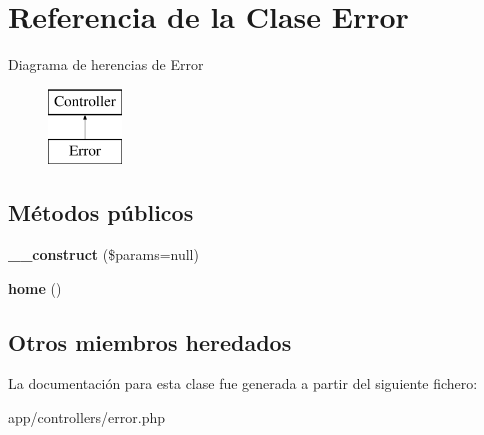 \hypertarget{class_error}{}\section{Referencia de la Clase Error}
\label{class_error}
Diagrama de herencias de Error\begin{figure}[H]
\begin{center}
\leavevmode
\includegraphics[height=2.000000cm]{class_error}
\end{center}
\end{figure}
\subsection*{Métodos públicos}
\begin{DoxyCompactItemize}
\item 
\hypertarget{class_error_a05014738840640fff5d40cc0604cb5c9}{}{\bfseries \+\_\+\+\_\+construct} (\$params=null)\label{class_error_a05014738840640fff5d40cc0604cb5c9}

\item 
\hypertarget{class_error_a174b8e4c7d4d7363c6f773671defdeff}{}{\bfseries home} ()\label{class_error_a174b8e4c7d4d7363c6f773671defdeff}

\end{DoxyCompactItemize}
\subsection*{Otros miembros heredados}


La documentación para esta clase fue generada a partir del siguiente fichero\+:\begin{DoxyCompactItemize}
\item 
app/controllers/error.\+php\end{DoxyCompactItemize}
